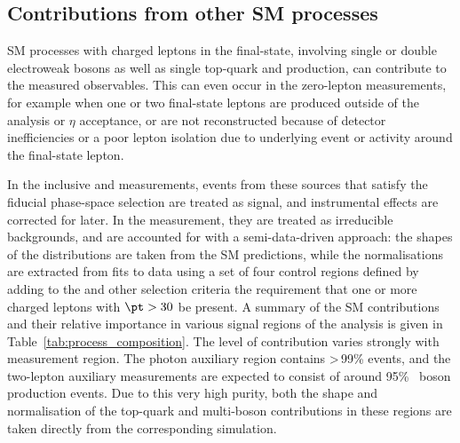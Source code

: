 \documentclass[atlasdraft=false, cernpreprint, UKenglish, texmf, orcidlogo]{atlasdoc}
\begin{document}
 
 
 
\subsection{Contributions from other SM processes \label{sec:smbkg}}
 
SM processes with charged leptons in the final-state, involving single or double electroweak bosons as well as single top-quark
and \ttbar production, can contribute to the
measured observables. This can even occur in the zero-lepton measurements, for example when one or two final-state leptons are produced outside
of the analysis \pt or \(\eta \) acceptance, or are not reconstructed because of
detector inefficiencies or a poor lepton isolation due to underlying event or \pileup activity around the final-state lepton.
 
In the inclusive \ptmiss and \ptrec measurements, events from these sources that satisfy the fiducial phase-space selection are treated as signal, and instrumental effects are
corrected for later. In the \Znunu measurement, they are treated as irreducible backgrounds, and are accounted for with a semi-data-driven approach:
the shapes of the distributions are taken from the SM predictions, while the normalisations are extracted from fits to data using a set of four control regions defined by
adding to the \ptmiss and other selection criteria the requirement that one or more charged leptons with $\pt > 30$ \GeV be present.
A summary of the SM contributions and their relative importance in various signal regions of the analysis is given in Table~\ref{tab:process_composition}.
The level of contribution varies strongly with measurement region. The photon auxiliary region contains \textgreater\,99\% \onegjets{} events, and the two-lepton auxiliary measurements are expected to consist of around 95\%  \Zboson\ boson production events.  Due to this very high purity,
both the shape and normalisation of the top-quark and multi-boson contributions in these regions are taken directly from the corresponding
simulation.
 
\end{document}
